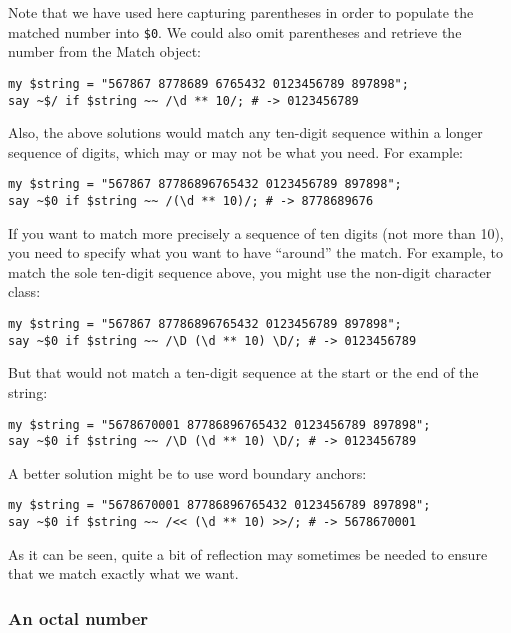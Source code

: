 Note that we have used here capturing parentheses in order 
to populate the matched number into \verb'$0'. We could also 
omit parentheses and retrieve the number from the Match object:

\begin{verbatim}
my $string = "567867 8778689 6765432 0123456789 897898";
say ~$/ if $string ~~ /\d ** 10/; # -> 0123456789
\end{verbatim}
%

Also, the above solutions would match any ten-digit sequence 
within a longer sequence of digits, which may or may not 
be what you need. For example:

\begin{verbatim}
my $string = "567867 87786896765432 0123456789 897898";
say ~$0 if $string ~~ /(\d ** 10)/; # -> 8778689676
\end{verbatim}

If you want to match more precisely a sequence of ten 
digits (not more than 10), you need to specify what you 
want to have ``around'' the match. For example, to 
match the sole ten-digit sequence above, you might use 
the non-digit character class:

\begin{verbatim}
my $string = "567867 87786896765432 0123456789 897898";
say ~$0 if $string ~~ /\D (\d ** 10) \D/; # -> 0123456789
\end{verbatim}

But that would not match a ten-digit sequence at the start 
or the end of the string:

\begin{verbatim}
my $string = "5678670001 87786896765432 0123456789 897898";
say ~$0 if $string ~~ /\D (\d ** 10) \D/; # -> 0123456789
\end{verbatim}

A better solution might be to use word boundary anchors:

\begin{verbatim}
my $string = "5678670001 87786896765432 0123456789 897898";
say ~$0 if $string ~~ /<< (\d ** 10) >>/; # -> 5678670001
\end{verbatim}

As it can be seen, quite a bit of reflection may 
sometimes be needed to ensure that we match exactly 
what we want. 

\subsubsection{An octal number}

